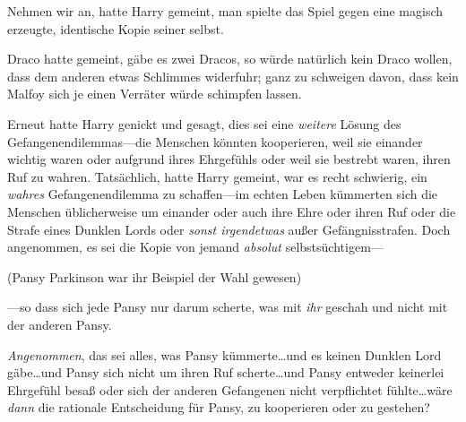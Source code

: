 Nehmen wir an, hatte Harry gemeint, man spielte das Spiel gegen eine magisch erzeugte, identische Kopie seiner selbst.

Draco hatte gemeint, gäbe es zwei Dracos, so würde natürlich kein Draco wollen, dass dem anderen etwas Schlimmes widerfuhr; ganz zu schweigen davon, dass kein Malfoy sich je einen Verräter würde schimpfen lassen.

Erneut hatte Harry genickt und gesagt, dies sei eine \emph{weitere} Lösung des Gefangenendilemmas—die Menschen könnten kooperieren, weil sie einander wichtig waren oder aufgrund ihres Ehrgefühls oder weil sie bestrebt waren, ihren Ruf zu wahren. Tatsächlich, hatte Harry gemeint, war es recht schwierig, ein \emph{wahres} Gefangenendilemma zu schaffen—im echten Leben kümmerten sich die Menschen üblicherweise um einander oder auch ihre Ehre oder ihren Ruf oder die Strafe eines Dunklen Lords oder \emph{sonst irgendetwas} außer Gefängnisstrafen. Doch angenommen, es sei die Kopie von jemand \emph{absolut} selbstsüchtigem—

(Pansy Parkinson war ihr Beispiel der Wahl gewesen)

—so dass sich jede Pansy nur darum scherte, was mit \emph{ihr} geschah und nicht mit der anderen Pansy.

\emph{Angenommen}, das sei alles, was Pansy kümmerte…und es keinen Dunklen Lord gäbe…und Pansy sich nicht um ihren Ruf scherte…und Pansy entweder keinerlei Ehrgefühl besaß oder sich der anderen Gefangenen nicht verpflichtet fühlte…wäre \emph{dann} die rationale Entscheidung für Pansy, zu kooperieren oder zu gestehen?

